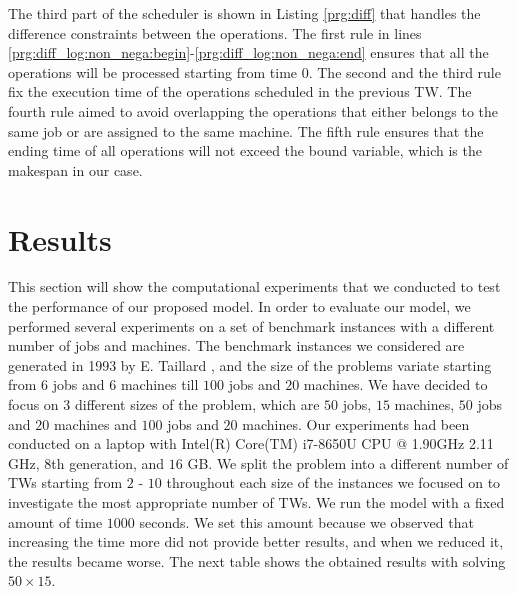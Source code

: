 \documentclass{tlp} %
\begin{document}
% 

The third part of the scheduler is shown in Listing \ref{prg:diff} that handles the difference constraints between the operations. The first rule in lines \ref{prg:diff_log:non_nega:begin}-\ref{prg:diff_log:non_nega:end} ensures that all the operations will be processed starting from time $0$. The second and the third rule fix the execution time of the operations scheduled in the previous TW. The fourth rule aimed to avoid overlapping the operations that either belongs to the same job or are assigned to the same machine. The fifth rule ensures that the ending time of all operations will not exceed the bound variable, which is the makespan in our case. 


\section{Results}
This section will show the computational experiments that we conducted to test the performance of our proposed model. In order to evaluate our model, we performed several experiments on a set of benchmark instances with a different number of jobs and machines. The benchmark instances we considered are generated in 1993 by E. Taillard \cite{taillard1993benchmarks}, and the size of the problems variate starting from $6$ jobs and $6$ machines till $100$ jobs and $20$ machines. We have decided to focus on $3$ different sizes of the problem, which are $50$ jobs, $15$ machines, $50$ jobs and $20$ machines and $100$ jobs and $20$ machines. Our experiments had been conducted on a laptop with Intel(R) Core(TM) i7-8650U CPU @ 1.90GHz 2.11 GHz, 8th generation, and $16$ GB. We split the problem into a different number of TWs starting from $2$ - $10$ throughout each size of the instances we focused on to investigate the most appropriate number of TWs. We run the model with a fixed amount of time $1000$ seconds. We set this amount because we observed that increasing the time more did not provide better results, and when we reduced it, the results became worse. The next table shows the obtained results with solving $50 \times 15$.
\end{document}
